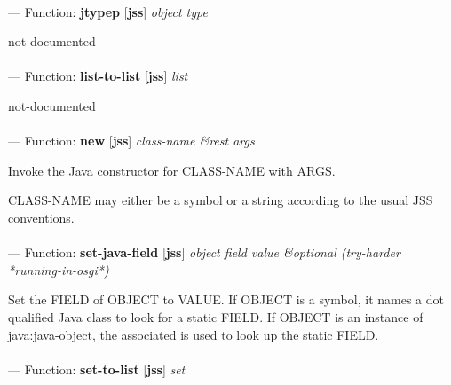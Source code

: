 \paragraph{}
\label{JSS:JTYPEP}
--- Function: \textbf{jtypep} [\textbf{jss}] \textit{object type}

\begin{adjustwidth}{5em}{5em}
not-documented
\end{adjustwidth}

\paragraph{}
\label{JSS:LIST-TO-LIST}
--- Function: \textbf{list-to-list} [\textbf{jss}] \textit{list}

\begin{adjustwidth}{5em}{5em}
not-documented
\end{adjustwidth}

\paragraph{}
\label{JSS:NEW}
--- Function: \textbf{new} [\textbf{jss}] \textit{class-name \&rest args}

\begin{adjustwidth}{5em}{5em}
Invoke the Java constructor for CLASS-NAME with ARGS.

CLASS-NAME may either be a symbol or a string according to the usual JSS conventions.
\end{adjustwidth}

\paragraph{}
\label{JSS:SET-JAVA-FIELD}
--- Function: \textbf{set-java-field} [\textbf{jss}] \textit{object field value \&optional (try-harder *running-in-osgi*)}

\begin{adjustwidth}{5em}{5em}
Set the FIELD of OBJECT to VALUE.
If OBJECT is a symbol, it names a dot qualified Java class to look for
a static FIELD.  If OBJECT is an instance of java:java-object, the
associated is used to look up the static FIELD.
\end{adjustwidth}

\paragraph{}
\label{JSS:SET-TO-LIST}
--- Function: \textbf{set-to-list} [\textbf{jss}] \textit{set}

